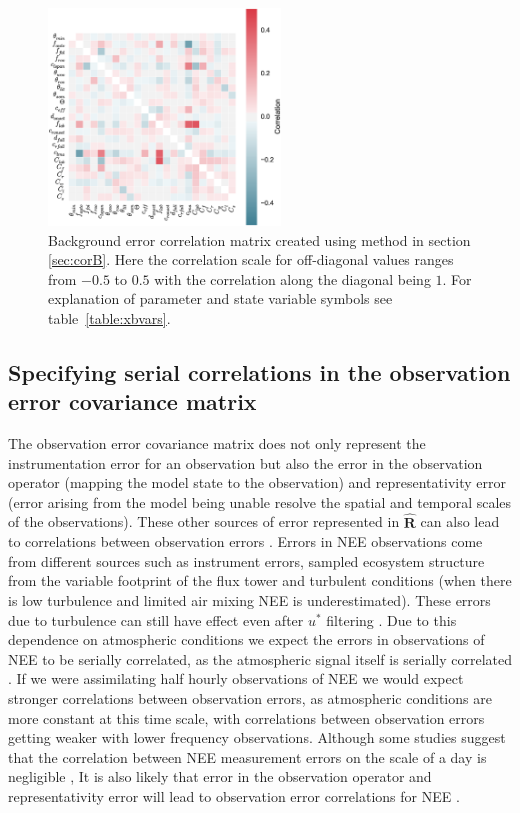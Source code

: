\documentclass[review]{elsarticle}
\begin{document}
\begin{figure}[ht]
    \centering
    \includegraphics[width=0.55\textwidth]{bedccor.eps}
    \caption{Background error correlation matrix created using method in section \ref{sec:corB}. Here the correlation scale for off-diagonal values ranges from $-0.5$ to $0.5$ with the correlation along the diagonal being $1$. For explanation of parameter and state variable symbols see table~\ref{table:xbvars}.}
    \label{fig:Bcorr}
\end{figure}

\subsection{Specifying serial correlations in the observation error covariance matrix} \label{sec:corR}

The observation error covariance matrix does not only represent the instrumentation error for an observation but also the error in the observation operator (mapping the model state to the observation) and representativity error (error arising from the model being unable resolve the spatial and temporal scales of the observations). These other sources of error represented in $\hat{\textbf{R}}$ can also lead to correlations between observation errors \citep{Waller2014}. Errors in NEE observations come from different sources such as instrument errors, sampled ecosystem structure from the variable footprint of the flux tower and turbulent conditions (when there is low turbulence and limited air mixing NEE is underestimated). These errors due to turbulence can still have effect even after $u^{*}$ filtering \citep{Papale2006}. Due to this dependence on atmospheric conditions we expect the errors in observations of NEE to be serially correlated, as the atmospheric signal itself is serially correlated \citep{Daley1992}. If we were assimilating half hourly observations of NEE we would expect stronger correlations between observation errors, as atmospheric conditions are more constant at this time scale, with correlations between observation errors getting weaker with lower frequency observations. Although some studies suggest that the correlation between NEE measurement errors on the scale of a day is negligible \citep{lasslop:hal-00297973}, It is also likely that error in the observation operator and representativity error will lead to observation error correlations for NEE \citep{Waller2014}.
\end{document}
